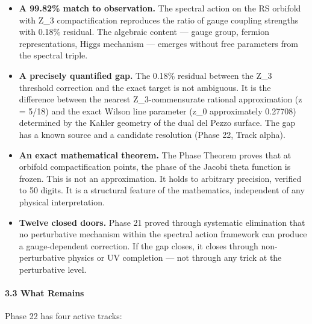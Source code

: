 \begin{itemize}[nosep,leftmargin=*]
  \item \textbf{A 99.82\% match to observation.} The spectral action on the RS orbifold with Z\_3 compactification reproduces the ratio of gauge coupling strengths with 0.18\% residual. The algebraic content — gauge group, fermion representations, Higgs mechanism — emerges without free parameters from the spectral triple.
  \item \textbf{A precisely quantified gap.} The 0.18\% residual between the Z\_3 threshold correction and the exact target is not ambiguous. It is the difference between the nearest Z\_3-commensurate rational approximation (z = 5/18) and the exact Wilson line parameter (z\_0 approximately 0.27708) determined by the Kahler geometry of the dual del Pezzo surface. The gap has a known source and a candidate resolution (Phase 22, Track alpha).
  \item \textbf{An exact mathematical theorem.} The Phase Theorem proves that at orbifold compactification points, the phase of the Jacobi theta function is frozen. This is not an approximation. It holds to arbitrary precision, verified to 50 digits. It is a structural feature of the mathematics, independent of any physical interpretation.
  \item \textbf{Twelve closed doors.} Phase 21 proved through systematic elimination that no perturbative mechanism within the spectral action framework can produce a gauge-dependent correction. If the gap closes, it closes through non-perturbative physics or UV completion — not through any trick at the perturbative level.
\end{itemize}


\paragraph*{3.3 What Remains}


Phase 22 has four active tracks:


